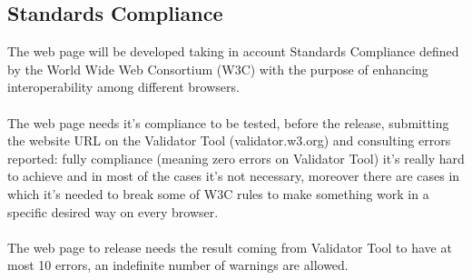 \subsection{Standards Compliance}
The web page will be developed taking in account Standards Compliance defined by the World Wide Web Consortium (W3C) with the purpose of enhancing interoperability among different browsers. 
\\
\\
The web page needs it’s compliance to be tested, before the release, submitting the website URL on the Validator Tool (validator.w3.org) and consulting errors reported: fully compliance (meaning zero errors on Validator Tool) it’s really hard to achieve and in most of the cases it’s not necessary, moreover there are cases in which it’s needed to break some of W3C rules to make something work in a specific desired way on every browser. 
\\
\\
The web page to release needs the result coming from Validator Tool to have at most 10 errors, an indefinite number of warnings are allowed. 
